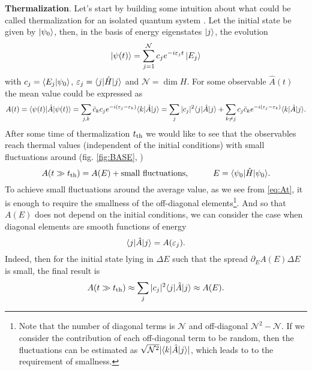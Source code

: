 
\textbf{Thermalization}. Let's start by building some intuition about what could be called thermalization for an isolated quantum system \cite{khlebnikov_thermalization_2014}. Let the initial state be given by $\left| \psi_0 \right\rangle$, then, in the basis of energy eigenstates $\left| j \right\rangle$, the evolution 
\begin{equation*}
	\left| \psi(t) \right\rangle = \sum_{j=1}^{\mathcal{N}} c_j e^{- i \varepsilon_j t} \left| E_j \right\rangle
\end{equation*}
with $c_j = \bk{E_j}{\psi_0}$, $\varepsilon_j = \bk{j}[\hat{H}]{j}$ and $\mathcal{N} = \dim H$. For some observable $\hat{A}(t)$ the mean value could be expressed as 
\begin{equation}
	A(t) = \bk{\psi(t)}[\hat{A}]{\psi(t)} = \sum_{j,k} \bar{c}_k c_j e^{-i (\varepsilon_j - \varepsilon_k)} \bk{k}[\hat{A}]{j}
	=
	\sum_j |c_j|^2 \bk{j}[\hat{A}]{j} + \sum_{k \neq j} c_j \bar{c}_k e^{-i (\varepsilon_j - \varepsilon_k)} \bk{k}[\hat{A}]{j}.
	\label{eq:At}
\end{equation}
After some time of thermalization $t_{\textnormal{th}}$ we would like to see that the observables reach thermal values (independent of the initial conditions) with small fluctuations around (fig. \ref{fig:BASE}, )
\begin{equation*}
	A(t \gg \tth) = A(E) + \text{small fluctuations},
	\hspace{10 mm} 
	E = \bk{\psi_0}[\hat{H}]{\psi_0}.
\end{equation*}
To achieve small fluctuations around the average value, as we see from \eqref{eq:At}, it is enough to require the smallness of the off-diagonal elements\footnote{
	Note that the number of diagonal terms is $\mathcal{N}$ and off-diagonal $\mathcal{N}^2- \mathcal{N}$. If we consider the contribution of each off-diagonal term to be random, then the fluctuations can be estimated as $\sqrt{\mathcal{N}^2} |\bk{k}[\hat{A}]{j}|$, which leads to to the requirement of smallness.
}. 
And so that $A(E)$ does not depend on the initial conditions, we can consider the case when diagonal elements are smooth functions of energy
\begin{equation*}
	\bk{j}[\hat{A}]{j} = A(\varepsilon_j).
\end{equation*}
Indeed, then for the initial state lying in $\Delta E $ such that the spread $\partial_E A(E) \Delta E$ is small, the final result is
\begin{equation*}
	A(t \gg \tth) \approx \sum_j |c_j|^2 \bk{j}[\hat{A}]{j} \approx  A(E).
\end{equation*}
